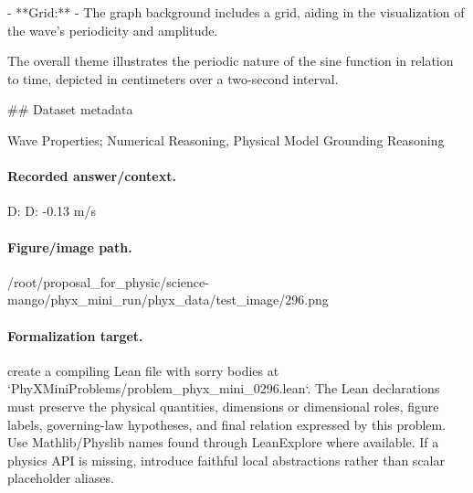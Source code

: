 - **Grid:**
  - The graph background includes a grid, aiding in the visualization of the wave's periodicity and amplitude.

The overall theme illustrates the periodic nature of the sine function in relation to time, depicted in centimeters over a two-second interval.

\#\# Dataset metadata

Wave Properties; Numerical Reasoning, Physical Model Grounding Reasoning

\paragraph{Recorded answer/context.}
D: D: -0.13 m/s

\paragraph{Figure/image path.}
/root/proposal\_for\_physic/science-mango/phyx\_mini\_run/phyx\_data/test\_image/296.png

\paragraph{Formalization target.}
create a compiling Lean file with sorry bodies at `PhyXMiniProblems/problem\_phyx\_mini\_0296.lean`. The Lean declarations must preserve the physical quantities, dimensions or dimensional roles, figure labels, governing-law hypotheses, and final relation expressed by this problem.
Use Mathlib/Physlib names found through LeanExplore where available. If a physics API is missing, introduce faithful local abstractions rather than scalar placeholder aliases.

